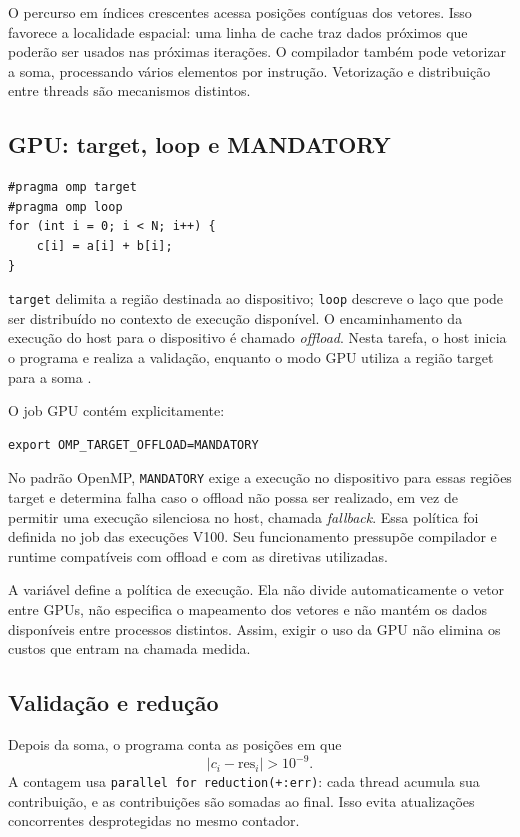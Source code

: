 \documentclass[12pt,a4paper]{article}
\begin{document}
O percurso em índices crescentes acessa posições contíguas dos vetores. Isso favorece a localidade espacial: uma linha de cache traz dados próximos que poderão ser usados nas próximas iterações. O compilador também pode vetorizar a soma, processando vários elementos por instrução. Vetorização e distribuição entre threads são mecanismos distintos.

\subsection{GPU: target, loop e MANDATORY}
\begin{lstlisting}[style=CStyle]
#pragma omp target
#pragma omp loop
for (int i = 0; i < N; i++) {
    c[i] = a[i] + b[i];
}
\end{lstlisting}
\texttt{target} delimita a região destinada ao dispositivo; \texttt{loop} descreve o laço que pode ser distribuído no contexto de execução disponível. O encaminhamento da execução do host para o dispositivo é chamado \textit{offload}. Nesta tarefa, o host inicia o programa e realiza a validação, enquanto o modo GPU utiliza a região target para a soma \cite{openmp}.

O job GPU contém explicitamente:
\begin{lstlisting}[style=Terminal]
export OMP_TARGET_OFFLOAD=MANDATORY
\end{lstlisting}
No padrão OpenMP, \texttt{MANDATORY} exige a execução no dispositivo para essas regiões target e determina falha caso o offload não possa ser realizado, em vez de permitir uma execução silenciosa no host, chamada \textit{fallback}. Essa política foi definida no job das execuções V100. Seu funcionamento pressupõe compilador e runtime compatíveis com offload e com as diretivas utilizadas.

A variável define a política de execução. Ela não divide automaticamente o vetor entre GPUs, não especifica o mapeamento dos vetores e não mantém os dados disponíveis entre processos distintos. Assim, exigir o uso da GPU não elimina os custos que entram na chamada medida.

\subsection{Validação e redução}
Depois da soma, o programa conta as posições em que
\[
|c_i-\mathrm{res}_i|>10^{-9}.
\]
A contagem usa \texttt{parallel for reduction(+:err)}: cada thread acumula sua contribuição, e as contribuições são somadas ao final. Isso evita atualizações concorrentes desprotegidas no mesmo contador.
\end{document}
